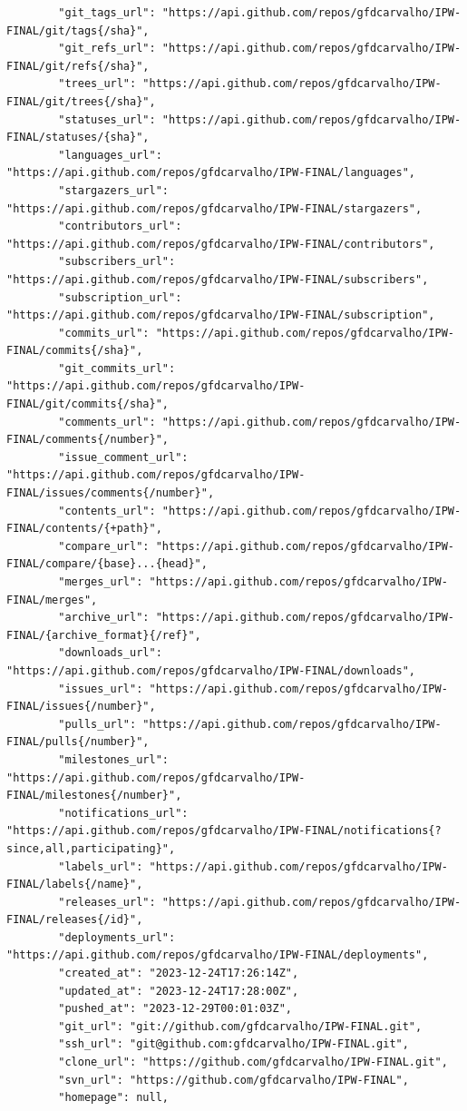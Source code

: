 \begin{lstlisting}
		"git_tags_url": "https://api.github.com/repos/gfdcarvalho/IPW-FINAL/git/tags{/sha}",
		"git_refs_url": "https://api.github.com/repos/gfdcarvalho/IPW-FINAL/git/refs{/sha}",
		"trees_url": "https://api.github.com/repos/gfdcarvalho/IPW-FINAL/git/trees{/sha}",
		"statuses_url": "https://api.github.com/repos/gfdcarvalho/IPW-FINAL/statuses/{sha}",
		"languages_url": "https://api.github.com/repos/gfdcarvalho/IPW-FINAL/languages",
		"stargazers_url": "https://api.github.com/repos/gfdcarvalho/IPW-FINAL/stargazers",
		"contributors_url": "https://api.github.com/repos/gfdcarvalho/IPW-FINAL/contributors",
		"subscribers_url": "https://api.github.com/repos/gfdcarvalho/IPW-FINAL/subscribers",
		"subscription_url": "https://api.github.com/repos/gfdcarvalho/IPW-FINAL/subscription",
		"commits_url": "https://api.github.com/repos/gfdcarvalho/IPW-FINAL/commits{/sha}",
		"git_commits_url": "https://api.github.com/repos/gfdcarvalho/IPW-FINAL/git/commits{/sha}",
		"comments_url": "https://api.github.com/repos/gfdcarvalho/IPW-FINAL/comments{/number}",
		"issue_comment_url": "https://api.github.com/repos/gfdcarvalho/IPW-FINAL/issues/comments{/number}",
		"contents_url": "https://api.github.com/repos/gfdcarvalho/IPW-FINAL/contents/{+path}",
		"compare_url": "https://api.github.com/repos/gfdcarvalho/IPW-FINAL/compare/{base}...{head}",
		"merges_url": "https://api.github.com/repos/gfdcarvalho/IPW-FINAL/merges",
		"archive_url": "https://api.github.com/repos/gfdcarvalho/IPW-FINAL/{archive_format}{/ref}",
		"downloads_url": "https://api.github.com/repos/gfdcarvalho/IPW-FINAL/downloads",
		"issues_url": "https://api.github.com/repos/gfdcarvalho/IPW-FINAL/issues{/number}",
		"pulls_url": "https://api.github.com/repos/gfdcarvalho/IPW-FINAL/pulls{/number}",
		"milestones_url": "https://api.github.com/repos/gfdcarvalho/IPW-FINAL/milestones{/number}",
		"notifications_url": "https://api.github.com/repos/gfdcarvalho/IPW-FINAL/notifications{?since,all,participating}",
		"labels_url": "https://api.github.com/repos/gfdcarvalho/IPW-FINAL/labels{/name}",
		"releases_url": "https://api.github.com/repos/gfdcarvalho/IPW-FINAL/releases{/id}",
		"deployments_url": "https://api.github.com/repos/gfdcarvalho/IPW-FINAL/deployments",
		"created_at": "2023-12-24T17:26:14Z",
		"updated_at": "2023-12-24T17:28:00Z",
		"pushed_at": "2023-12-29T00:01:03Z",
		"git_url": "git://github.com/gfdcarvalho/IPW-FINAL.git",
		"ssh_url": "git@github.com:gfdcarvalho/IPW-FINAL.git",
		"clone_url": "https://github.com/gfdcarvalho/IPW-FINAL.git",
		"svn_url": "https://github.com/gfdcarvalho/IPW-FINAL",
		"homepage": null,

\end{lstlisting}
